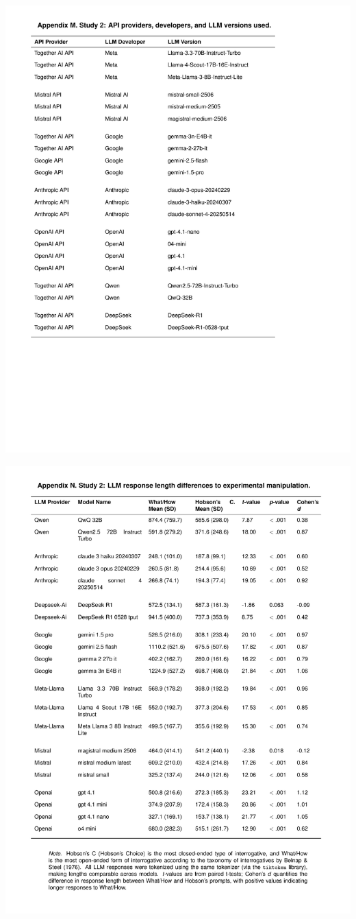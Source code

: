 \documentclass[
  12pt,
]{article}
\begin{document}
\includegraphics{../03_outputs/04_appendices/appendix_m.pdf}

\includegraphics{../03_outputs/04_appendices/appendix_n.pdf}
\end{document}
